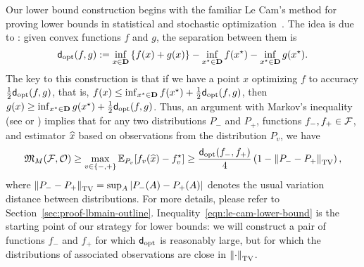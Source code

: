 Our lower bound construction begins with the familiar Le Cam's method for
proving lower bounds in statistical and stochastic
optimization~\citep{Tsybakov09,AgarwalBaRaWa12,Duchi17}. The idea is due to
\citeauthor{AgarwalBaRaWa12}: given convex functions $f$ and $g$, the
separation between them is
\begin{equation*}
  \fndist(f, g)
  \defeq \inf_{x \in \domain}
  \left\{f(x) + g(x) \right\}
  - \inf_{x\opt \in \domain} f(x\opt) - \inf_{x\opt \in \domain} g(x\opt).
\end{equation*}
The key to this construction is that if we have a point $x$ optimizing $f$
to accuracy $\half \fndist(f, g)$, that is, $f(x) \le \inf_{x\opt \in
  \domain} f(x\opt) + \half\fndist(f, g)$, then $g(x) \ge \inf_{x\opt \in
  \domain} g(x\opt) + \half \fndist(f, g)$.  Thus, an argument with Markov's
inequality (see \citet[Eq.~(18)]{AgarwalBaRaWa12} or
\citet[Ch.~4.1]{Duchi17}) implies that for any two
distributions $P_-$ and $P_+$, functions $f_-, f_+ \in \mathcal{F}$, and estimator
$\widehat{x}$ based on observations from the distribution $P_v$, we have
\begin{equation}
  \label{eqn:le-cam-lower-bound}
  \minimax_M(\ffamily, \ofamily)
  \ge
  \max_{v \in \{-, +\}}
  \E_{P_v}[f_v(\what{x}) - f_v\opt]
  \ge \frac{\fndist(f_-, f_+)}{4}
  \left(1 - \tvnorm{P_- - P_+}\right),
\end{equation}
where $\tvnorm{P_- - P_+} = \sup_A |P_-(A) - P_+(A)|$ denotes the usual
variation distance between distributions. For more details, please refer to Section~\ref{sec:proof-lbmain-outline}.
Inequality~\eqref{eqn:le-cam-lower-bound} is the starting point of our
strategy for lower bounds: we will construct a pair of functions $f_-$ and
$f_+$ for which $\fndist$ is reasonably large, but for which the
distributions of associated observations are close in $\tvnorm{\cdot}$.

